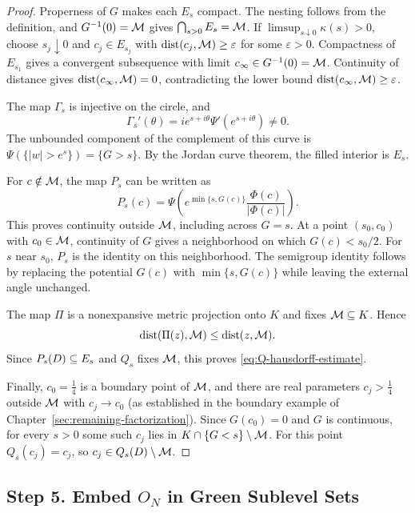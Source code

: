 \begin{proof}
Properness of \(G\) makes each \(E_s\) compact. The nesting follows
from the definition, and \(G^{-1}(0)=\mathcal M\) gives
\(\bigcap_{s>0}E_s=\mathcal M\). If \(\limsup_{s\downarrow0}\kappa(s)>0\),
choose \(s_j\downarrow0\) and \(c_j\in E_{s_j}\) with
\(\operatorname{dist}(c_j,\mathcal M)\ge\varepsilon\) for some \(\varepsilon>0\).
Compactness of \(E_{s_1}\) gives a convergent subsequence with limit
\(c_\infty\in G^{-1}(0)=\mathcal M\). Continuity of distance gives
\(\operatorname{dist}(c_\infty,\mathcal M)=0\), contradicting the lower bound
\(\operatorname{dist}(c_\infty,\mathcal M)\ge\varepsilon\).

The map \(\Gamma_s\) is injective on the circle, and
\[
 \Gamma_s'(\theta)=ie^{s+i\theta}\Psi'(e^{s+i\theta})\ne0.
\]
The unbounded component of the complement of this curve is
\(\Psi(\{|w|>e^s\})=\{G>s\}\). By the Jordan curve theorem, the filled
interior is \(E_s\).

For \(c\notin\mathcal M\), the map \(P_s\) can be written as
\[
 P_s(c)=
 \Psi\left(e^{\min\{s,G(c)\}}\frac{\Phi(c)}{|\Phi(c)|}\right).
\]
This proves continuity outside \(\mathcal M\), including across \(G=s\). At a
point \((s_0,c_0)\) with \(c_0\in\mathcal M\), continuity of \(G\) gives a
neighborhood on which \(G(c)<s_0/2\). For \(s\) near \(s_0\), \(P_s\)
is the identity on this neighborhood. The semigroup identity follows
by replacing the potential \(G(c)\) with \(\min\{s,G(c)\}\) while
leaving the external angle unchanged.

The map \(\Pi\) is a nonexpansive metric projection onto \(K\) and fixes
\(\mathcal M\subseteq K\). Hence
\[
 \operatorname{dist}(\Pi(z),\mathcal M)\le\operatorname{dist}(z,\mathcal M).
\]
Since \(P_s(D)\subseteq E_s\) and \(Q_s\) fixes \(\mathcal M\), this proves
\eqref{eq:Q-hausdorff-estimate}.

Finally, \(c_0=\frac14\) is a boundary point of \(\mathcal M\), and there are
real parameters \(c_j>\frac14\) outside \(\mathcal M\) with \(c_j\to c_0\)
(as established in the boundary example of
Chapter~\ref{sec:remaining-factorization}). Since \(G(c_0)=0\) and
\(G\) is continuous, for every \(s>0\) some such \(c_j\) lies in
\(K\cap\{G<s\}\setminus\mathcal M\). For this point \(Q_s(c_j)=c_j\), so
\(c_j\in Q_s(D)\setminus\mathcal M\).
\end{proof}

\subsection{Step 5. Embed \(O_N\) in Green Sublevel Sets}

